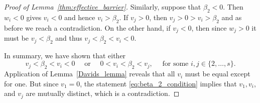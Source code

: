 \begin{proof}[Proof of Lemma~\ref{thm:effective_barrier}]
    	Similarly, suppose that $\beta_2 < 0$. 
    	Then $w_i <0$ gives $v_i < 0$ and hence $v_i > \beta_2$.
    	If $v_j > 0$, then $v_j > 0 > v_i > \beta_2$ and as before we reach 
    	a contradiction.
    	On the other hand, if $v_j < 0$, then since $w_j >0$ it must be 
    	$v_j < \beta_2$ and thus  $v_j < \beta_2 < v_i < 0$.
    	
    	In summary, we have shown that either 
    	\begin{equation}\label{eq:beta_2_condition}
    		v_j < \beta_2  < v_i < 0 \quad \text{ or } \quad 0 < v_i < \beta_2 < v_j, \quad \text{ for some } i, j \in \{2, \dots, s\}.
    \end{equation}
    Application of Lemma~\ref{Davids_lemma} reveals that all $v_i$ must 
    be equal except for one.
    But since $v_1 = 0$, the statement \eqref{eq:beta_2_condition} implies that 
    $v_1, v_i$, and $v_j$ are mutually distinct, which is a contradiction.

\end{proof}
